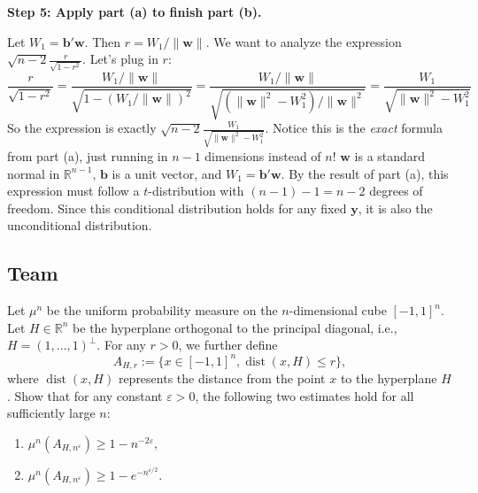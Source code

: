 \begin{solution}
\textbf{Step 5: Apply part (a) to finish part (b).}

Let $W_1 = \mathbf{b}'\mathbf{w}$. Then $r = W_1 / \|\mathbf{w}\|$.
We want to analyze the expression $\sqrt{n-2} \frac{r}{\sqrt{1-r^2}}$. Let's plug in $r$:
\[ \frac{r}{\sqrt{1-r^2}} = \frac{W_1 / \|\mathbf{w}\|}{\sqrt{1 - (W_1 / \|\mathbf{w}\|)^2}} = \frac{W_1 / \|\mathbf{w}\|}{\sqrt{(\|\mathbf{w}\|^2 - W_1^2) / \|\mathbf{w}\|^2}} = \frac{W_1}{\sqrt{\|\mathbf{w}\|^2 - W_1^2}} \]
So the expression is exactly $\sqrt{n-2} \frac{W_1}{\sqrt{\|\mathbf{w}\|^2 - W_1^2}}$.
Notice this is the \textit{exact} formula from part (a), just running in $n-1$ dimensions instead of $n$!
$\mathbf{w}$ is a standard normal in $\mathbb{R}^{n-1}$, $\mathbf{b}$ is a unit vector, and $W_1 = \mathbf{b}'\mathbf{w}$.
By the result of part (a), this expression must follow a $t$-distribution with $(n-1) - 1 = n-2$ degrees of freedom.
Since this conditional distribution holds for any fixed $\mathbf{y}$, it is also the unconditional distribution.
\end{solution}

\subsection{Team}

\begin{exercise}\label{probability:2017:9}
Let $\mu^n$ be the uniform probability measure on the $n$-dimensional cube $[-1, 1]^n$. Let $H \in \mathbb{R}^n$ be the hyperplane orthogonal to the principal diagonal, i.e., $H = (1, \dots, 1)^\perp$. For any $r > 0$, we further define
\[
A_{H, r} := \{x \in [-1, 1]^n, \operatorname{dist}(x, H) \leq r \},
\]
where $\operatorname{dist}(x, H)$ represents the distance from the point $x$ to the hyperplane $H$. Show that for any constant $\varepsilon > 0$, the following two estimates hold for all sufficiently large $n$:
\begin{enumerate}
    \item $\mu^n(A_{H, n^\varepsilon}) \geq 1 - n^{-2\varepsilon}$,
    \item $\mu^n(A_{H, n^\varepsilon}) \geq 1 - e^{-n^{\varepsilon/2}}$.
\end{enumerate}
\end{exercise}

